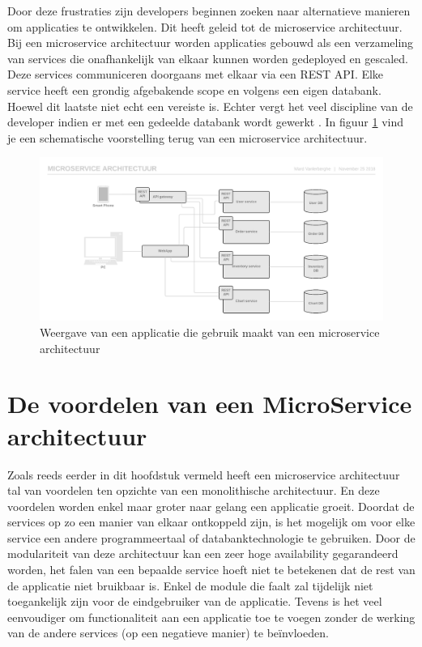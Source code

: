 Door deze frustraties zijn developers beginnen zoeken naar alternatieve manieren om applicaties te ontwikkelen. Dit heeft geleid tot de microservice architectuur. Bij een microservice architectuur worden applicaties gebouwd als een verzameling van services die onafhankelijk van elkaar kunnen worden gedeployed en gescaled. Deze services communiceren doorgaans met elkaar via een \gls{REST API}. Elke service heeft een grondig afgebakende scope en volgens \textcite{Fowler2014} een eigen databank. Hoewel dit laatste niet echt een vereiste is. Echter vergt het veel discipline van de developer indien er met een gedeelde databank wordt gewerkt \autocite{Young2016}. In figuur \ref{fig:microservices} vind je een schematische voorstelling terug van een microservice architectuur.

\begin{figure}
	\includegraphics[width=\linewidth]{img/microservices.png}
	\caption{Weergave van een applicatie die gebruik maakt van een microservice architectuur}
	\label{fig:microservices}
\end{figure}

\section{De voordelen van een MicroService architectuur}
Zoals reeds eerder in dit hoofdstuk vermeld heeft een microservice architectuur tal van voordelen ten opzichte van een monolithische architectuur. En deze voordelen worden enkel maar groter naar gelang een applicatie groeit. Doordat de services op zo een manier van elkaar ontkoppeld zijn, is het mogelijk om voor elke service een andere programmeertaal of databanktechnologie te gebruiken. Door de modulariteit van deze architectuur kan een zeer hoge availability gegarandeerd worden, het falen van een bepaalde service hoeft niet te betekenen dat de rest van de applicatie niet bruikbaar is. Enkel de module die faalt zal tijdelijk niet toegankelijk zijn voor de eindgebruiker van de applicatie. Tevens is het veel eenvoudiger om functionaliteit aan een applicatie toe te voegen zonder de werking van de andere services (op een negatieve manier) te beïnvloeden.

